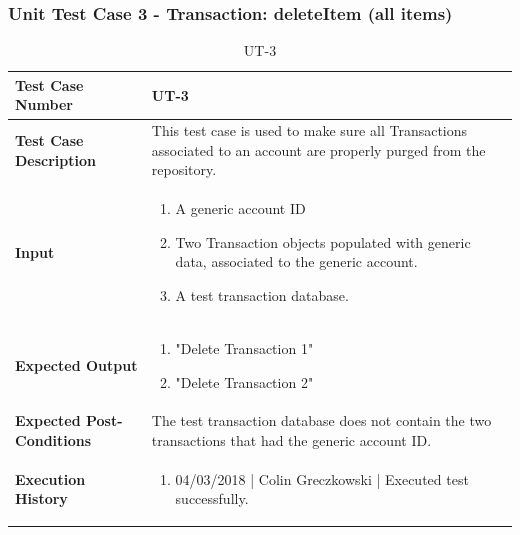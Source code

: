 \documentclass[12pt]{article}
\begin{document}
\subsubsection{Unit Test Case 3 - Transaction: deleteItem (all items)} 
\def\arraystretch{1.5}%
\begin{table}[htbp]
\centering
\caption {UT-3}
\label{UT-3}
\begin{tabularx}{\textwidth}{ | l | X |}
\hline
\textbf{Test Case Number}      &  UT-3                         \\ \hline
\textbf{Test Case Description}    &  This test case is used to make sure all Transactions associated to an account are properly purged from the repository.                \\ \hline
\textbf{Input}         & 	\begin{enumerate}
          \item A generic account ID
	\item Two Transaction objects populated with generic data, associated to the generic account.
	\item A test transaction database.
\end{enumerate} \\ \hline

\textbf{Expected Output}     & \begin{enumerate}
	\item "Delete Transaction 1"
           \item "Delete Transaction 2"
\end{enumerate} \\ \hline
\textbf{Expected Post-Conditions}           & The test transaction database does not contain the two transactions that had the generic account ID.                \\ \hline
\textbf{Execution History}   &  \begin{enumerate}
	\item 04/03/2018 | Colin Greczkowski | Executed test successfully.
\end {enumerate} \\ \hline
\end{tabularx}
\end{table}
\clearpage

\end{document}
